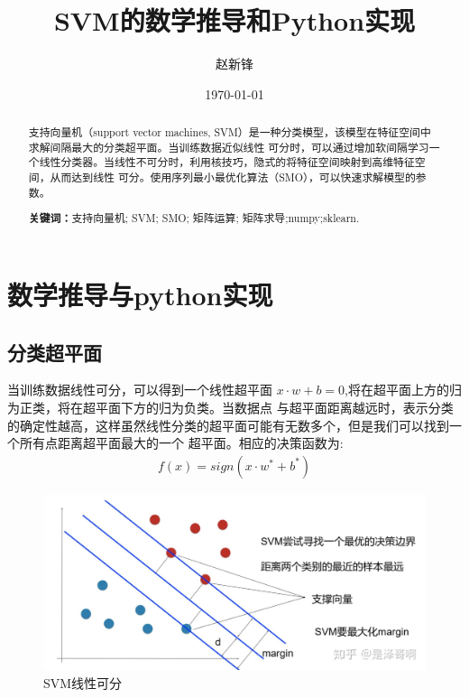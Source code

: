 \documentclass[12pt, a4paper, oneside]{ctexart}
\title{\textbf{SVM的数学推导和Python实现}}
\author{赵新锋}
\date{\today}
\begin{document}
\maketitle

\setcounter{page}{0}
\maketitle
\thispagestyle{empty}

\begin{abstract}
支持向量机（support vector machines, SVM）是一种分类模型，该模型在特征空间中求解间隔最大的分类超平面。当训练数据近似线性
可分时，可以通过增加软间隔学习一个线性分类器。当线性不可分时，利用核技巧，隐式的将特征空间映射到高维特征空间，从而达到线性
可分。使用序列最小最优化算法（SMO），可以快速求解模型的参数。
\par\textbf{关键词：}支持向量机; SVM; SMO; 矩阵运算; 矩阵求导;numpy;sklearn. 
\end{abstract}

\newpage
{}
\setcounter{page}{1}
\tableofcontents
\newpage
\setcounter{page}{1}


\newpage
\section{数学推导与python实现}

\subsection{分类超平面}
当训练数据线性可分，可以得到一个线性超平面 $ x \cdot w + b = 0 $,将在超平面上方的归为正类，将在超平面下方的归为负类。当数据点
与超平面距离越远时，表示分类的确定性越高，这样虽然线性分类的超平面可能有无数多个，但是我们可以找到一个所有点距离超平面最大的一个
超平面。相应的决策函数为:
\begin{align*}
    f(x) = sign(x \cdot w^* + b^*)
\end{align*}
\begin{figure}[htbp]
    \centering
    \includegraphics[width=14cm]{svm1.jpg}
    \caption{SVM线性可分}\label{fig1}
\end{figure}
\end{document}
